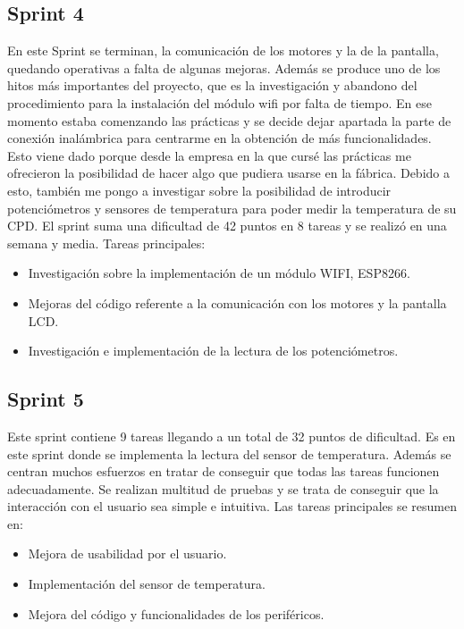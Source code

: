 \subsection{Sprint 4}
En este Sprint se terminan, la comunicación de los motores y la de la pantalla, quedando operativas a falta de algunas mejoras. Además se produce uno de los hitos más importantes del proyecto, que es la investigación y abandono del procedimiento para la instalación del módulo wifi por falta de tiempo. En ese momento estaba comenzando las prácticas y se decide dejar apartada la parte de conexión inalámbrica para centrarme en la obtención de más funcionalidades. Esto viene dado porque desde la empresa en la que cursé las prácticas me ofrecieron la posibilidad de hacer algo que pudiera usarse en la fábrica.
Debido a esto, también me pongo a investigar sobre la posibilidad de introducir potenciómetros y sensores de temperatura para poder medir la temperatura de su CPD. El sprint suma una dificultad de 42 puntos en 8 tareas y se realizó en una semana y media. Tareas principales:
\begin{itemize}
\item Investigación sobre la implementación de un módulo WIFI, ESP8266.
\item Mejoras del código referente a la comunicación con los motores y la pantalla LCD.
\item Investigación e implementación de la lectura de los potenciómetros.
\end{itemize}


\subsection{Sprint 5}
Este sprint contiene 9 tareas llegando a un total de 32 puntos de dificultad. Es en este sprint donde se implementa la lectura del sensor de temperatura. Además se centran muchos esfuerzos en tratar de conseguir que todas las tareas funcionen adecuadamente. Se realizan multitud de pruebas y se trata de conseguir que la interacción con el usuario sea simple e intuitiva. Las tareas principales se resumen en:
\begin{itemize}
\item Mejora de usabilidad por el usuario.
\item Implementación del sensor de temperatura.
\item Mejora del código y funcionalidades de los periféricos.
\end{itemize}


